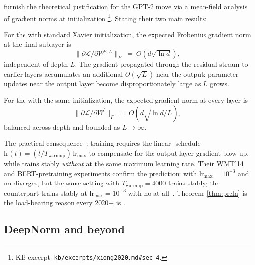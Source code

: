 \citet{xiong2020} furnish the theoretical justification for the GPT-2
move via a mean-field analysis of gradient norms at
initialization%
\footnote{KB excerpt: \texttt{kb/excerpts/xiong2020.md\#sec-4}.}.
Stating their two main results:
\begin{theorem}
\label{thm:postln}
For the   with standard Xavier initialization, the
expected Frobenius gradient norm at the final  sublayer is
\[
  \|\partial \mathcal{L} / \partial W^{2,L}\|_F
  \;=\; O\!\left( d \sqrt{\ln d} \right),
\]
independent of depth $L$. The gradient propagated through the residual
stream to earlier layers accumulates an additional $O(\sqrt{L})$ near
the output: parameter updates near the output layer become
disproportionately large as $L$ grows.
\end{theorem}
\begin{theorem}
\label{thm:preln}
For the   with the same initialization, the expected
gradient norm at every layer is
\[
  \|\partial \mathcal{L} / \partial W^{l}\|_F
  \;=\; O\!\left( d \sqrt{\ln d / L} \right),
\]
balanced across depth and bounded as $L \to \infty$.
\end{theorem}
The practical consequence~\citep[\S 4.1, \S 5]{xiong2020}: 
training requires the linear- schedule
$\mathrm{lr}(t) = (t/T_{\mathrm{warmup}})\,\mathrm{lr}_{\max}$ to
compensate for the output-layer gradient blow-up, while  trains
stably \emph{without } at the same maximum learning rate. Their
WMT'14 and BERT-pretraining experiments confirm the prediction:
 with $\mathrm{lr}_{\max} = 10^{-3}$ and no  diverges, but
the same setting with $T_{\mathrm{warmup}} = 4000$ trains stably; the
 counterpart trains stably at $\mathrm{lr}_{\max} = 10^{-3}$ with
no  at all~\citep[\S 5]{xiong2020}. Theorem~\ref{thm:preln} is the
load-bearing reason every 2020+   is .

\subsection{DeepNorm and beyond}
\label{sec:norm-deepnorm}

